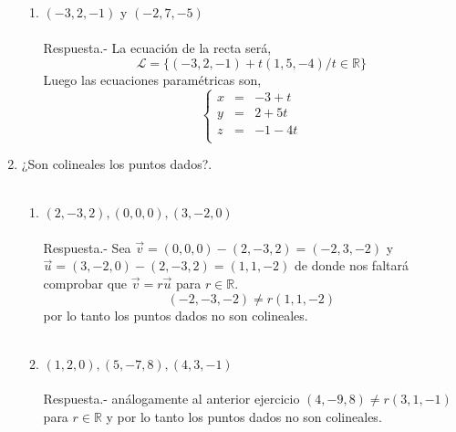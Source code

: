 \begin{enumerate}
\begin{enumerate}[\bfseries a)]
	    \item $(-3,2,-1)$ y $(-2,7,-5)$\\\\
		Respuesta.-\; La ecuación de la recta será,
		$$\mathcal{L} = \lbrace (-3,2,-1) + t(1,5,-4) / t\in \mathbb{R} \rbrace$$
		Luego las ecuaciones paramétricas son, 
		$$\left\{\begin{array}{rcr}
		    x&=&-3+t\\
		    y&=&2+5t\\
		    z&=&-1-4t\\
		\end{array}\right.$$
		\vspace{0.5cm}

	\end{enumerate}

    \item ¿Son colineales los puntos dados?.\\\\

	\begin{enumerate}[\bfseries a)]
	    
	    \item $(2,-3,2),(0,0,0),(3,-2,0)$\\\\
		Respuesta.-\; Sea $\vec{v}=(0,0,0)-(2,-3,2)=(-2,3,-2)$ y $\vec{u}=(3,-2,0)-(2,-3,2)=(1,1,-2)$ de donde nos faltará comprobar que $\vec{v}=r\vec{u}$ para $r\in \mathbb{R}$.
		$$(-2,-3,-2)\neq r(1,1,-2)$$
		por lo tanto los puntos dados no son colineales.\\\\

	    \item $(1,2,0),(5,-7,8),(4,3,-1)$\\\\
		Respuesta.-\; análogamente al anterior ejercicio $(4,-9,8)\neq r(3,1,-1)$ para $r\in \mathbb{R}$ y por lo tanto los puntos dados no son colineales.\\\\

	\end{enumerate}


\end{enumerate}
